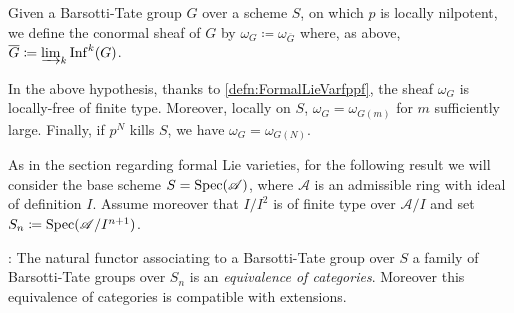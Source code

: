 \begin{defn}
	Given a Barsotti-Tate group $G$ over a scheme $S$, on which $p$ is locally nilpotent,
	we define the conormal sheaf of $G$ by $\omega_G \coloneqq \omega_{\overline{G}}$
	where, as above, $\overline{G} \coloneqq \varinjlim_k \mathrm{Inf}^k(G)$.
\end{defn}


\begin{rem}\label{rem:ConormalSheafBT}
	In the above hypothesis,
	thanks to \cref{defn:FormalLieVarfppf}, 
	the sheaf $\omega_G$ is
	locally-free of finite type.
	Moreover, locally on $S$, $\omega_G = \omega_{G(m)}$ for
	$m$ sufficiently large.
	Finally, if $p^N$ kills $S$, we have $\omega_G = \omega_{G(N)}$.
\end{rem}


\noindent
As in the section regarding formal Lie varieties,
for the following result we will consider the base scheme \(S = \operatorname{Spec}(\mathscr{A})\),
where \(\mathscr{A}\) is an admissible ring with ideal of definition \(I\).
Assume moreover that \(I/I^2\) is of finite type over \(\mathscr{A}/I\) and
set \(S_n \coloneqq \operatorname{Spec}(\mathscr{A}/I^{ n+1 })\).
\begin{lem}\label{lem:BT/admissible}
:	The natural functor associating to a Barsotti-Tate group over \(S\)
	a family of Barsotti-Tate groups over \(S_n\) is an
	\emph{equivalence of categories}.
	Moreover this equivalence of categories is compatible
	with extensions.
\end{lem}


